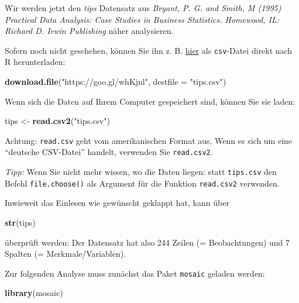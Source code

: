 \documentclass[12pt,ngerman,paper=a4,pagesize,DIV=13]{scrreprt}
\newenvironment{Shaded}{\begin{snugshade}}{\end{snugshade}}
\newcommand{\DataTypeTok}[1]{\textcolor[rgb]{0.13,0.29,0.53}{#1}}
\newcommand{\KeywordTok}[1]{\textcolor[rgb]{0.13,0.29,0.53}{\textbf{#1}}}
\newcommand{\NormalTok}[1]{#1}
\newcommand{\StringTok}[1]{\textcolor[rgb]{0.31,0.60,0.02}{#1}}
\begin{document}
Wir werden jetzt den \emph{tips} Datensatz aus \emph{Bryant, P. G. and
Smith, M (1995) Practical Data Analysis: Case Studies in Business
Statistics. Homewood, IL: Richard D. Irwin Publishing} näher
analysieren.

Sofern noch nicht geschehen, können Sie ihn z. B.
\href{https://goo.gl/whKjnl}{hier} als \texttt{csv}-Datei direkt nach R
herunterladen:

\begin{Shaded}
\begin{Highlighting}[]
\KeywordTok{download.file}\NormalTok{(}\StringTok{"https://goo.gl/whKjnl"}\NormalTok{, }\DataTypeTok{destfile =} \StringTok{"tips.csv"}\NormalTok{)}
\end{Highlighting}
\end{Shaded}

Wenn sich die Daten auf Ihrem Computer gespeichert sind, können Sie sie
laden:

\begin{Shaded}
\begin{Highlighting}[]
\NormalTok{tips <-}\StringTok{ }\KeywordTok{read.csv2}\NormalTok{(}\StringTok{"tips.csv"}\NormalTok{)}
\end{Highlighting}
\end{Shaded}

Achtung: \texttt{read.csv} geht vom amerikanischen Format aus. Wenn es
sich um eine \enquote{deutsche CSV-Datei} handelt, verwenden Sie
\texttt{read.csv2}.

\emph{Tipp:} Wenn Sie nicht mehr wissen, wo die Daten liegen: statt
\texttt{tips.csv} den Befehl \texttt{file.choose()} als Argument für die
Funktion \texttt{read.csv2} verwenden.

Inwieweit das Einlesen wie gewünscht geklappt hat, kann über

\begin{Shaded}
\begin{Highlighting}[]
\KeywordTok{str}\NormalTok{(tips)}
\end{Highlighting}
\end{Shaded}

überprüft werden: Der Datensatz hat also 244 Zeilen (= Beobachtungen)
und 7 Spalten (= Merkmale/Variablen).

Zur folgenden Analyse muss zunächst das Paket \texttt{mosaic} geladen
werden:

\begin{Shaded}
\begin{Highlighting}[]
\KeywordTok{library}\NormalTok{(mosaic)}
\end{Highlighting}
\end{Shaded}
\end{document}
